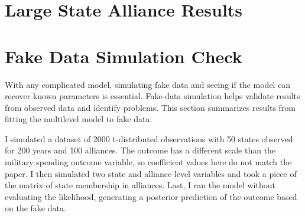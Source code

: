 \documentclass[12pt]{article}
\begin{document}
%


\section{Large State Alliance Results} 




\section{Fake Data Simulation Check}


With any complicated model, simulating fake data and seeing if the model can recover known parameters is essential. 
Fake-data simulation helps validate results from observed data and identify problems. 
This section summarizes results from fitting the multilevel model to fake data.


I simulated a dataset of 2000 t-distributed observations with 50 states observed for 200 years and 100 alliances. 
The outcome has a different scale than the military spending outcome variable, so coefficient values here do not match the paper.  
I then simulated two state and alliance level variables and took a piece of the matrix of state membership in alliances. 
Last, I ran the model without evaluating the likelihood, generating a posterior prediction of the outcome based on the fake data.
\end{document}
